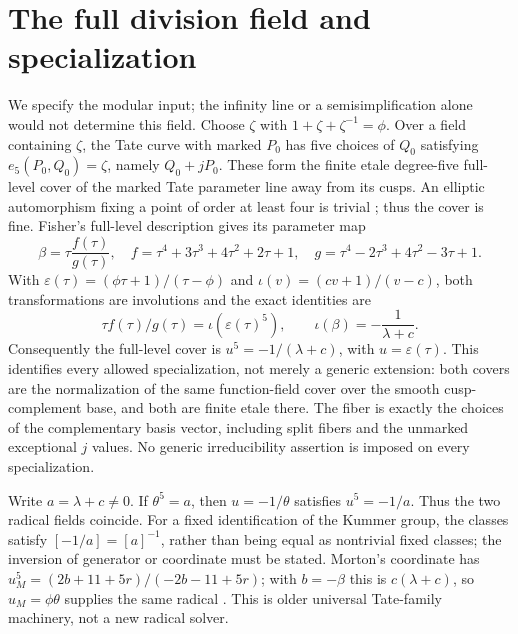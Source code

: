 \documentclass[11pt]{article}
\begin{document}
\section{The full division field and specialization}
We specify the modular input; the infinity line or a semisimplification
alone would not determine this field. Choose $\zeta$ with
$1+\zeta+\zeta^{-1}=\phi$. Over a field containing $\zeta$, the Tate
curve with marked $P_0$ has five choices of $Q_0$ satisfying
$e_5(P_0,Q_0)=\zeta$, namely $Q_0+jP_0$. These form the finite etale
degree-five full-level cover of the marked Tate parameter line away
from its cusps. An elliptic automorphism fixing a point of order at
least four is trivial \cite[Lemma 1.1]{fisher}; thus the cover is fine.
Fisher's full-level description \cite[section 2 and Lemma 3.4,
p.~194]{fisher} gives its parameter map
\[
\beta=\tau\frac{f(\tau)}{g(\tau)},\quad
f=\tau^4+3\tau^3+4\tau^2+2\tau+1,\quad
g=\tau^4-2\tau^3+4\tau^2-3\tau+1.
\]
With $\varepsilon(\tau)=(\phi\tau+1)/(\tau-\phi)$ and
$\iota(v)=(cv+1)/(v-c)$, both transformations are involutions and
the exact identities are
\begin{equation}\label{kummer}
\tau f(\tau)/g(\tau)=\iota(\varepsilon(\tau)^5),\qquad
\iota(\beta)=-\frac1{\lambda+c}.
\end{equation}
Consequently the full-level cover is $u^5=-1/(\lambda+c)$, with
$u=\varepsilon(\tau)$. This identifies every allowed specialization,
not merely a generic extension: both covers are the normalization of
the same function-field cover over the smooth cusp-complement base,
and both are finite etale there. The fiber is exactly the choices of
the complementary basis vector, including split fibers and the
unmarked exceptional $j$ values. No generic irreducibility assertion
is imposed on every specialization.

Write $a=\lambda+c\ne0$. If $\theta^5=a$, then $u=-1/\theta$ satisfies
$u^5=-1/a$. Thus the two radical fields coincide. For a fixed
identification of the Kummer group, the classes satisfy
$[-1/a]=[a]^{-1}$, rather than being equal as nontrivial fixed classes;
the inversion of generator or coordinate must be stated. Morton's
coordinate has $u_M^5=(2b+11+5r)/(-2b-11+5r)$; with $b=-\beta$ this
is $c(\lambda+c)$, so $u_M=\phi\theta$ supplies the same radical
\cite[(2.1), p.~6 of the arXiv version]{morton}. This is older
universal Tate-family machinery, not a new radical solver.
\end{document}
